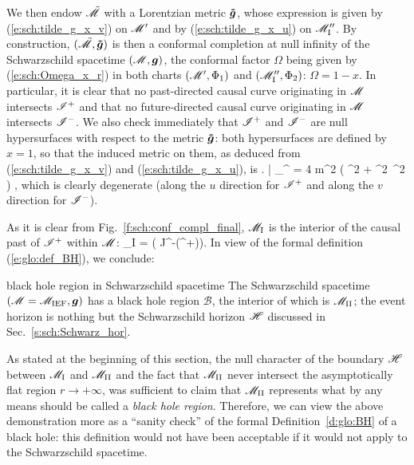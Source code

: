 We then endow $\tilde{\mathscr{M}}$ with a Lorentzian metric $\bm{\tilde{g}}$, whose
expression is given by (\ref{e:sch:tilde_g_x_v}) on $\mathscr{M}'$ and
by (\ref{e:sch:tilde_g_x_u}) on $\mathscr{M}''_{\rm I}$.
By construction, $(\tilde{\mathscr{M}},\bm{\tilde{g}})$ is then a conformal completion at null
infinity of the Schwarzschild spacetime $(\mathscr{M},\bm{g})$, the conformal factor
$\Omega$ being given by (\ref{e:sch:Omega_x_r}) in both
charts $(\mathscr{M}',\Phi_1)$ and $(\mathscr{M}''_{\rm I},\Phi_2)$: $\Omega = 1 -x$.
In particular, it is clear that no past-directed causal curve originating in
$\mathscr{M}$ intersects $\mathscr{I}^+$ and that no future-directed causal curve originating in
$\mathscr{M}$ intersects $\mathscr{I}^-$. We also check immediately that $\mathscr{I}^+$ and $\mathscr{I}^-$
are null hypersurfaces with respect to the metric $\bm{\tilde{g}}$:
both hypersurfaces are defined by $x=1$, so that the induced metric on them,
as
deduced from (\ref{e:sch:tilde_g_x_v}) and
(\ref{e:sch:tilde_g_x_u}), is
\be
    \left.  \right| _{\scri^\pm} = 4 m^2 \left(
        \dd \th^2  + \sin^2\th \, \dd \ph^2 \right) ,
\ee
which is clearly degenerate (along the $u$ direction for $\mathscr{I}^+$
and along the $v$ direction for $\mathscr{I}^-$).

As it is clear from Fig.~\ref{f:sch:conf_compl_final}, $\mathscr{M}_{\rm I}$
is the interior of the causal past of $\mathscr{I}^+$ within $\mathscr{M}$:
\be
    \M_{\rm I} = \left( J^-(\scri^+)\cap\M \right).
\ee
In view of the formal definition (\ref{e:glo:def_BH}), we conclude:
\begin{tprop}{black hole region in Schwarzschild spacetime}{}
The Schwarzschild spacetime $(\mathscr{M}=\mathscr{M}_{\rm IEF}, \bm{g})$
has a black hole region $\mathscr{B}$, the interior
of which is $\mathscr{M}_{\rm II}$; the event horizon is nothing but the
Schwarzschild horizon $\mathscr{H}$ discussed in Sec.~\ref{s:sch:Schwarz_hor}.
\end{tprop}

\begin{remark}
As stated at the beginning of this section, the null character of the boundary
$\mathscr{H}$ between $\mathscr{M}_{\rm I}$ and $\mathscr{M}_{\rm II}$ and the fact that
$\mathscr{M}_{\rm II}$ never intersect the asymptotically flat region $r\rightarrow +\infty$,
was sufficient to claim that $\mathscr{M}_{\rm II}$ represents what by any means should be
called a \emph{black hole region}.
Therefore, we can view the above demonstration more as a ``sanity check''
of the formal Definition~\ref{d:glo:BH} of a black hole:
this definition would not have been acceptable if it would not
apply to the Schwarzschild spacetime.
\end{remark}

